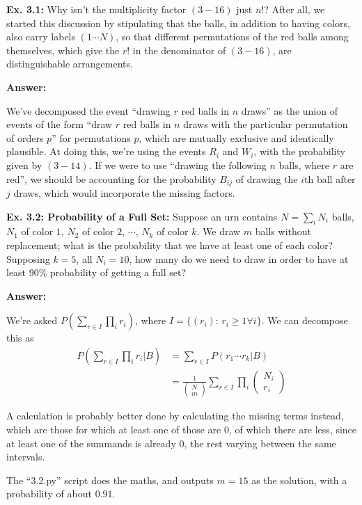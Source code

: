 \documentclass{article}
\begin{document}
\textbf{Ex. 3.1: }Why isn't the multiplicity factor $(3-16)$ just $n!$? After all, we started this discussion by stipulating that the balls, in addition to having colors, also carry labels $(1\cdots N)$, so that different permutations of the red balls among themselves, which give the $r!$ in the denominator of $(3-16)$, are distinguishable arrangements.

\textbf{Answer: }

We've decomposed the event ``drawing $r$ red balls in $n$ draws'' as the union of events of the form ``draw $r$ red balls in $n$ draws with the particular permutation of orders $p$'' for permutations $p$, which are mutually exclusive and identically plausible. At doing this, we're using the events $R_i$ and $W_i$, with the probability given by $(3-14)$. If we were to use ``drawing the following $n$ balls, where $r$ are red'', we should be accounting for the probability $B_{ij}$ of drawing the $i$th ball after $j$ draws, which would incorporate the missing factors.

\textbf{Ex. 3.2: Probability of a Full Set: }Suppose an urn contains $N=\sum_iN_i$ balls, $N_1$ of color $1$, $N_2$ of color $2$, $\cdots$, $N_k$ of color $k$. We draw $m$ balls without replacement; what is the probability that we have at least one of each color? Supposing $k=5$, all $N_i=10$, how many do we need to draw in order to have at least $90\%$ probability of getting a full set?

\textbf{Answer: }

We're asked $P\left(\sum_{r\in I}\prod_ir_i\right)$, where $I=\{(r_i):\,r_i\geq1\forall i\}$. We can decompose this as 
\begin{align}
	P\left(\sum_{r\in I}\prod_ir_i|B\right)&=\sum_{r\in I}P\left(r_1\cdots r_k|B\right)\\
	&=\frac1{\begin{pmatrix}N\\m\end{pmatrix}}\sum_{r\in I}\prod_i\begin{pmatrix}N_i\\r_i\end{pmatrix}
\end{align}

A calculation is probably better done by calculating the missing terms instead, which are those for which at least one of those are $0$, of which there are less, since at least one of the summands is already $0$, the rest varying between the same intervals.

The ``3.2.py'' script does the maths, and outputs $m=15$ as the solution, with a probability of about $0.91$.
\end{document}
